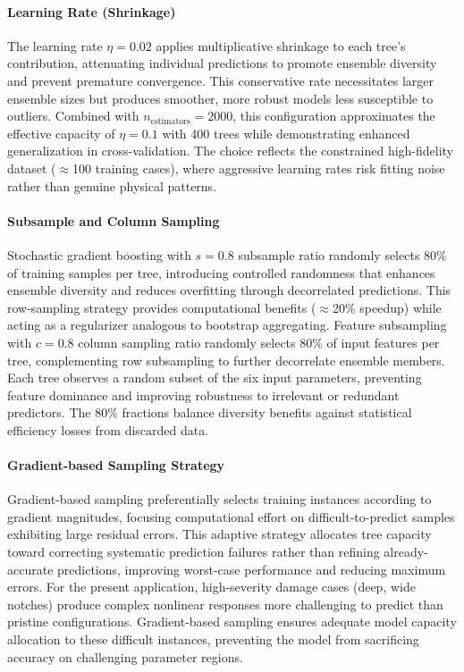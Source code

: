 \documentclass[12pt,a4paper]{report}
\begin{document}
\paragraph{Learning Rate (Shrinkage)} 
The learning rate $\eta = 0.02$ applies multiplicative shrinkage to each tree's contribution, attenuating individual predictions to promote ensemble diversity and prevent premature convergence. This conservative rate necessitates larger ensemble sizes but produces smoother, more robust models less susceptible to outliers. Combined with $n_{\text{estimators}} = 2000$, this configuration approximates the effective capacity of $\eta = 0.1$ with 400 trees while demonstrating enhanced generalization in cross-validation. The choice reflects the constrained high-fidelity dataset ($\approx$100 training cases), where aggressive learning rates risk fitting noise rather than genuine physical patterns.

\paragraph{Subsample and Column Sampling} 
Stochastic gradient boosting with $s = 0.8$ subsample ratio randomly selects 80\% of training samples per tree, introducing controlled randomness that enhances ensemble diversity and reduces overfitting through decorrelated predictions. This row-sampling strategy provides computational benefits ($\approx$20\% speedup) while acting as a regularizer analogous to bootstrap aggregating. Feature subsampling with $c = 0.8$ column sampling ratio randomly selects 80\% of input features per tree, complementing row subsampling to further decorrelate ensemble members. Each tree observes a random subset of the six input parameters, preventing feature dominance and improving robustness to irrelevant or redundant predictors. The 80\% fractions balance diversity benefits against statistical efficiency losses from discarded data.

\paragraph{Gradient-based Sampling Strategy} 
Gradient-based sampling preferentially selects training instances according to gradient magnitudes, focusing computational effort on difficult-to-predict samples exhibiting large residual errors. This adaptive strategy allocates tree capacity toward correcting systematic prediction failures rather than refining already-accurate predictions, improving worst-case performance and reducing maximum errors. For the present application, high-severity damage cases (deep, wide notches) produce complex nonlinear responses more challenging to predict than pristine configurations. Gradient-based sampling ensures adequate model capacity allocation to these difficult instances, preventing the model from sacrificing accuracy on challenging parameter regions.
\end{document}
